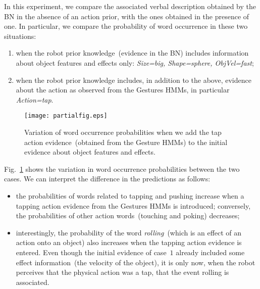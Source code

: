 In this experiment, we compare the associated verbal description obtained by the \acl{BN} in the absence of an action prior, with the ones obtained in the presence of one. In particular, we compare the probability of word occurrence in these two situations:
\begin{enumerate}
\item when the robot prior knowledge~(evidence in the \ac{BN}) includes information about object features and effects only: \emph{Size=big, Shape=sphere, ObjVel=fast};

\item when the robot prior knowledge includes, in addition to the above, evidence about the action as observed from the Gestures \acp{HMM}, in particular \emph{Action=tap}.
\end{enumerate}

\begin{figure}
\centering
\texttt{[image: partialfig.eps]}
\caption{Variation of word occurrence probabilities when we add the tap action evidence~(obtained from the Gesture \acp{HMM}) to the initial evidence about object features and effects.}
\label{fig:probdiff}
\end{figure}

Fig.~\ref{fig:probdiff} shows the variation in word occurrence probabilities between the two cases. We can interpret the difference in the predictions as follows:
\begin{itemize}
\item the probabilities of words related to tapping and pushing increase when a tapping action evidence from the Gestures \acp{HMM} is introduced; conversely, the probabilities of other action words~(touching and poking) decreases;

\item interestingly, the probability of the word \emph{rolling}~(which is an effect of an action onto an object) also increases when the tapping action evidence is entered. Even though the initial evidence of case~$1$ already included some effect information~(the velocity of the object), it is only now, when the robot perceives that the physical action was a tap, that the event rolling is associated.
\end{itemize}


